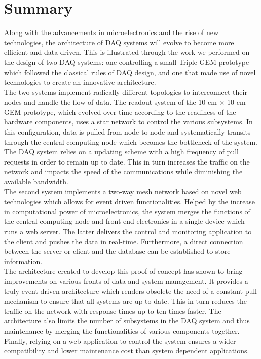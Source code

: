 \chapter{Summary}
\label{chap:III-3-summary}

  Along with the advancements in microelectronics and the rise of new technologies, the architecture of DAQ systems will evolve to become more efficient and data driven. This is illustrated through the work we performed on the design of two DAQ systems: one controlling a small Triple-GEM prototype which followed the classical rules of DAQ design, and one that made use of novel technologies to create an innovative architecture. \\

  The two systems implement radically different topologies to interconnect their nodes and handle the flow of data. The readout system of the 10 cm $ \times $ 10 cm GEM prototype, which evolved over time according to the readiness of the hardware components, uses a star network to control the various subsystems. In this configuration, data is pulled from node to node and systematically transits through the central computing node which becomes the bottleneck of the system. The DAQ system relies on a updating scheme with a high frequency of pull requests in order to remain up to date. This in turn increases the traffic on the network and impacts the speed of the communications while diminishing the available bandwidth. \\

  The second system implements a two-way mesh network based on novel web technologies which allows for event driven functionalities. Helped by the increase in computational power of microelectronics, the system merges the functions of the central computing node and front-end electronics in a single device which runs a web server. The latter delivers the control and monitoring application to the client and pushes the data in real-time. Furthermore, a direct connection between the server or client and the database can be established to store information. \\

  The architecture created to develop this proof-of-concept has shown to bring improvements on various fronts of data and system management. It provides a truly event-driven architecture which renders obsolete the need of a constant pull mechanism to ensure that all systems are up to date. This in turn reduces the traffic on the network with response times up to ten times faster. The architecture also limits the number of subsystems in the DAQ system and thus maintenance by merging the functionalities of various components together. Finally, relying on a web application to control the system ensures a wider compatibility and lower maintenance cost than system dependent applications.
